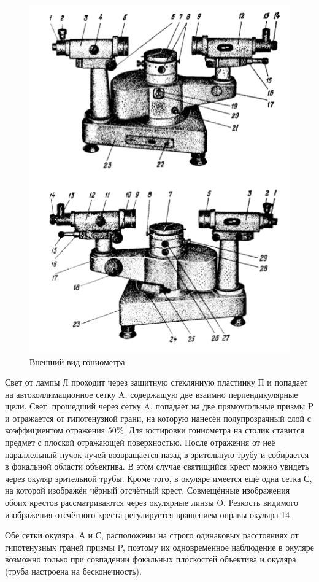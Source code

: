 \documentclass[12pt]{article}
\begin{document}
\begin{figure}[h!]
	\centering
	\includegraphics[width = 12cm, height = 15cm]{image1.png}
	\caption{Внешний вид гониометра}
\end{figure}
\par
	Свет от лампы Л проходит через защитную стеклянную пластинку П и попадает на автоколлимационное сетку A, содержащую две взаимно перпендикулярные щели. Свет, прошедший через сетку A, попадает на две прямоугольные призмы P и отражается от гипотенузной грани, на которую нанесён полупрозрачный слой с коэффициентом отражения $50\%$. Для юстировки гониометра на столик ставится предмет с плоской отражающей поверхностью. После отражения от неё параллельный пучок лучей возвращается назад в зрительную трубу и собирается в фокальной области объектива. В этом случае святищийся крест можно увидеть через окуляр зрительной трубы. Кроме того, в окуляре имеется ещё одна сетка С, на которой изображён чёрный отсчётный крест. Совмещённые изображения обоих крестов рассматриваются через окулярные линзы O. Резкость видимого изображения отсчётного креста регулируется вращением оправы окуляра 14.
\par
	Обе сетки окуляра, А и С, расположены на строго одинаковых расстояниях от гипотенузных граней призмы P, поэтому их одновременное наблюдение в окуляре возможно только при совпадении фокальных плоскостей объектива и окуляра (труба настроена на бесконечность).
\end{document}
